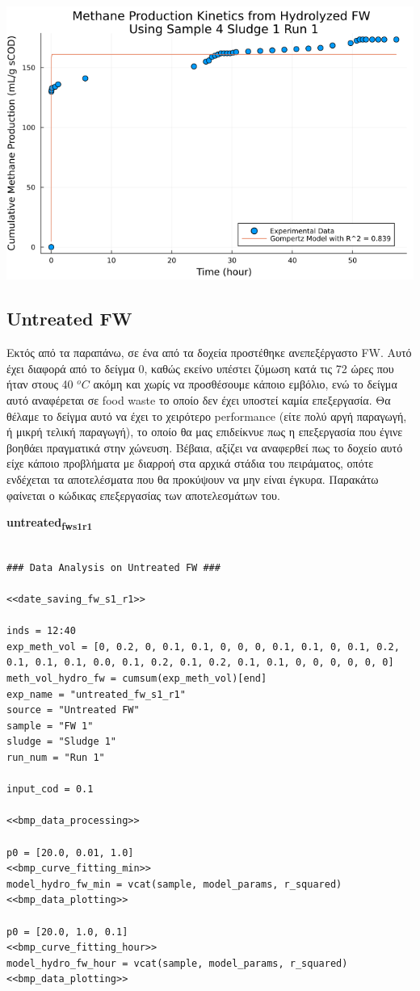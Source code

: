 \documentclass[11pt]{article}
\begin{document}
\begin{center}
\includegraphics[width=.9\linewidth]{../plots/BMPs/Hydrolyzed FW/methane_kinetics_hydrolysate_4_s1_r1_hour.png}
\end{center}

\subsection{Untreated FW}
\label{sec:orgb0c4b60}
Εκτός από τα παραπάνω, σε ένα από τα δοχεία προστέθηκε ανεπεξέργαστο FW. Αυτό έχει διαφορά από το δείγμα 0, καθώς εκείνο υπέστει ζύμωση κατά τις 72 ώρες που ήταν στους 40 \(^oC\) ακόμη και χωρίς να προσθέσουμε κάποιο εμβόλιο, ενώ το δείγμα αυτό αναφέρεται σε food waste το οποίο δεν έχει υποστεί καμία επεξεργασία. Θα θέλαμε το δείγμα αυτό να έχει το χειρότερο performance (είτε πολύ αργή παραγωγή, ή μικρή τελική παραγωγή), το οποίο θα μας επιδείκνυε πως η επεξεργασία που έγινε βοηθάει πραγματικά στην χώνευση. Βέβαια, αξίζει να αναφερθεί πως το δοχείο αυτό είχε κάποιο προβλήματα με διαρροή στα αρχικά στάδια του πειράματος, οπότε ενδέχεται τα αποτελέσματα που θα προκύψουν να μην είναι έγκυρα. Παρακάτω φαίνεται ο κώδικας επεξεργασίας των αποτελεσμάτων του.

\textbf{untreated\textsubscript{fw}\textsubscript{s1}\textsubscript{r1}}
\begin{verbatim}

### Data Analysis on Untreated FW ###

<<date_saving_fw_s1_r1>>

inds = 12:40
exp_meth_vol = [0, 0.2, 0, 0.1, 0.1, 0, 0, 0, 0.1, 0.1, 0, 0.1, 0.2, 0.1, 0.1, 0.1, 0.0, 0.1, 0.2, 0.1, 0.2, 0.1, 0.1, 0, 0, 0, 0, 0, 0]
meth_vol_hydro_fw = cumsum(exp_meth_vol)[end]
exp_name = "untreated_fw_s1_r1"
source = "Untreated FW"
sample = "FW 1"
sludge = "Sludge 1"
run_num = "Run 1"

input_cod = 0.1

<<bmp_data_processing>>

p0 = [20.0, 0.01, 1.0]
<<bmp_curve_fitting_min>>
model_hydro_fw_min = vcat(sample, model_params, r_squared)
<<bmp_data_plotting>>

p0 = [20.0, 1.0, 0.1]
<<bmp_curve_fitting_hour>>
model_hydro_fw_hour = vcat(sample, model_params, r_squared)
<<bmp_data_plotting>>
\end{verbatim}
\end{document}

